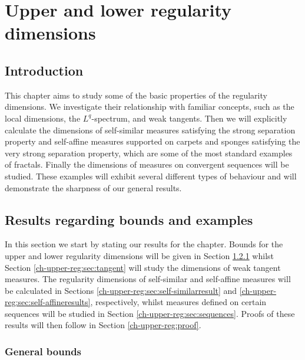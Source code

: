 \chapter{Upper and lower regularity dimensions}
\label{chap:upper_reg}


\section{Introduction}
\label{ch-upper-reg:intro-reg-dims}


This chapter aims to study some of the basic properties of the regularity dimensions. We investigate their relationship with familiar concepts, such as the local dimensions, the $L^q$-spectrum, and weak tangents. Then we will explicitly calculate the dimensions of self-similar measures satisfying the strong separation property and self-affine measures supported on carpets and sponges satisfying the very strong separation property, which are some of the most standard examples of fractals. Finally the dimensions of measures on convergent sequences will be studied. These examples will exhibit several different types of behaviour and will demonstrate the sharpness of our general results. 


\section{Results regarding bounds and examples}\label{ch-upper-reg:results}

In this section we start by stating our results for the chapter. Bounds for the upper and lower regularity dimensions will be given in Section \ref{ch-upper-reg:bounds} whilst Section \ref{ch-upper-reg:sec:tangent} will study the dimensions of weak tangent measures. The regularity dimensions of self-similar and self-affine measures will be calculated in Sections \ref{ch-upper-reg:sec:self-similarresult} and \ref{ch-upper-reg:sec:self-affineresults}, respectively, whilst measures defined on certain sequences will be studied in Section \ref{ch-upper-reg:sec:sequences}. Proofs of these results will then follow in Section \ref{ch-upper-reg:proof}.

\subsection{General bounds}\label{ch-upper-reg:bounds}

